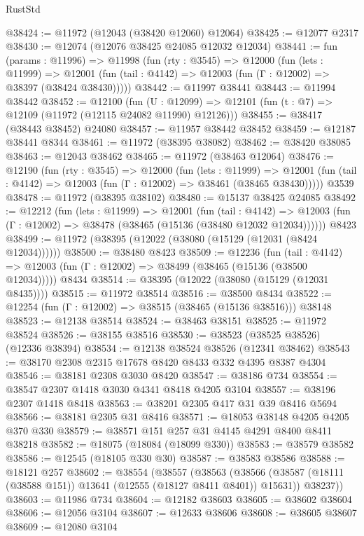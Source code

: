 \begin{lexlean}{RustStd}
\begin{coremodule}
@38424 := @11972 (@12043 (@38420 @12060) @12064)
@38425 := @12077 @2317
@38430 := @12074 (@12076 @38425 @24085 @12032 @12034)
@38441 := fun (params : @11996) =>
  @11998
    (fun (rty : @3545) =>
    @12000
      (fun (lets : @11999) =>
      @12001 (fun (tail : @4142) => @12003 (fun (Γ : @12002) => @38397 (@38424 @38430)))))
@38442 := @11997 @38441
@38443 := @11994 @38442
@38452 := @12100
    (fun (U : @12099) => @12101 (fun (t : @7) => @12109 (@11972 (@12115 @24082 @11990) @12126)))
@38455 := @38417 (@38443 @38452) @24080
@38457 := @11957 @38442 @38452
@38459 := @12187 @38441 @8344
@38461 := @11972 (@38395 @38082)
@38462 := @38420 @38085
@38463 := @12043 @38462
@38465 := @11972 (@38463 @12064)
@38476 := @12190
    (fun (rty : @3545) =>
    @12000
      (fun (lets : @11999) =>
      @12001 (fun (tail : @4142) => @12003 (fun (Γ : @12002) => @38461 (@38465 @38430)))))
    @3539
@38478 := @11972 (@38395 @38102)
@38480 := @15137 @38425 @24085
@38492 := @12212
    (fun (lets : @11999) =>
    @12001
      (fun (tail : @4142) =>
      @12003 (fun (Γ : @12002) => @38478 (@38465 (@15136 (@38480 @12032 @12034))))))
    @8423
@38499 := @11972 (@38395 (@12022 (@38080 (@15129 (@12031 (@8424 @12034))))))
@38500 := @38480 @8423
@38509 := @12236
    (fun (tail : @4142) => @12003 (fun (Γ : @12002) => @38499 (@38465 (@15136 (@38500 @12034)))))
    @8434
@38514 := @38395 (@12022 (@38080 (@15129 (@12031 @8435))))
@38515 := @11972 @38514
@38516 := @38500 @8434
@38522 := @12254 (fun (Γ : @12002) => @38515 (@38465 (@15136 @38516))) @38148
@38523 := @12138 @38514
@38524 := @38463 @38151
@38525 := @11972 @38524
@38526 := @38155 @38516
@38530 := @38523 (@38525 @38526) (@12336 @38394)
@38534 := @12138 @38524 @38526 (@12341 @38462)
@38543 := @38170 @2308 @2315 @17678 @8420 @8433 @332 @4395 @8387 @4304
@38546 := @38181 @2308 @3030 @8420
@38547 := @38186 @734
@38554 := @38547 @2307 @1418 @3030 @4341 @8418 @4205 @3104
@38557 := @38196 @2307 @1418 @8418
@38563 := @38201 @2305 @417 @31 @39 @8416 @5694
@38566 := @38181 @2305 @31 @8416
@38571 := @18053 @38148 @4205 @4205 @370 @330
@38579 := @38571 @151 @257 @31 @4145 @4291 @8400 @8411 @38218
@38582 := @18075 (@18084 (@18099 @330))
@38583 := @38579 @38582
@38586 := @12545 (@18105 @330 @30)
@38587 := @38583 @38586
@38588 := @18121 @257
@38602 := @38554
    (@38557
      (@38563
        (@38566 (@38587 (@18111 (@38588 @151)) @13641 (@12555 (@18127 @8411 @8401)) @15631))
        @38237))
@38603 := @11986 @734
@38604 := @12182 @38603
@38605 := @38602 @38604
@38606 := @12056 @3104
@38607 := @12633 @38606
@38608 := @38605 @38607
@38609 := @12080 @3104

\end{coremodule}
\end{lexlean}
